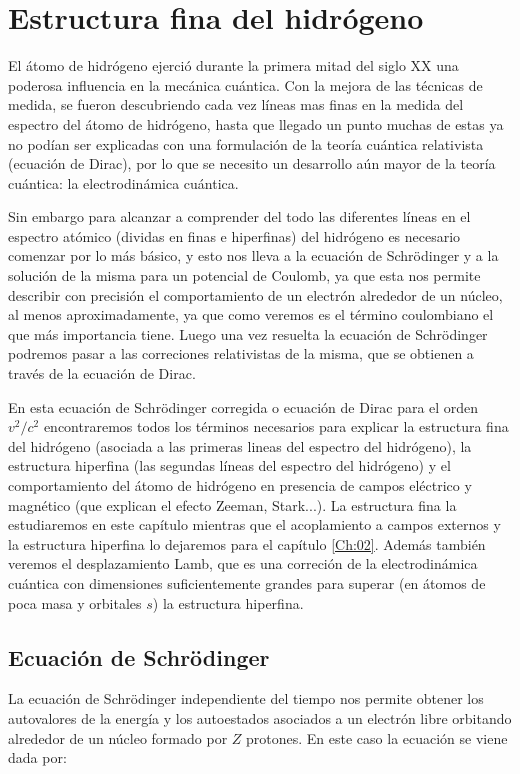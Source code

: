 \chapter{Estructura fina del hidrógeno}

El átomo de hidrógeno ejerció durante la primera mitad del siglo XX una poderosa influencia en la mecánica cuántica. Con la mejora de las técnicas de medida, se fueron descubriendo cada vez líneas mas finas en la medida del espectro del átomo de hidrógeno, hasta que llegado un punto muchas de estas ya no podían ser explicadas con una formulación de la teoría cuántica relativista (ecuación de Dirac), por lo que se necesito un desarrollo aún mayor de la teoría cuántica: la electrodinámica cuántica. 

Sin embargo para alcanzar a comprender del todo las diferentes líneas en el espectro atómico (dividas en finas e hiperfinas) del hidrógeno es necesario comenzar por lo más básico, y esto nos lleva a la ecuación de Schrödinger y a la solución de la misma para un potencial de Coulomb, ya que esta nos permite describir con precisión el comportamiento de un electrón alrededor de un núcleo, al menos aproximadamente, ya que como veremos es el término coulombiano el que más importancia tiene. Luego una vez resuelta la ecuación de Schrödinger podremos pasar a las correciones relativistas de la misma, que se obtienen a través de la ecuación de Dirac. 

En esta ecuación de Schrödinger corregida o ecuación de Dirac para el orden $v^2/c^2$ encontraremos todos los términos necesarios para explicar la estructura fina del hidrógeno (asociada a las primeras lineas del espectro del hidrógeno), la estructura hiperfina (las segundas líneas del espectro del hidrógeno) y el comportamiento del átomo de hidrógeno en presencia de campos eléctrico y magnético (que explican el efecto Zeeman, Stark...). La estructura fina la estudiaremos en este capítulo mientras que el acoplamiento a campos externos y la estructura hiperfina lo dejaremos para el capítulo \ref{Ch:02}. Además también veremos el desplazamiento Lamb, que es una correción de la electrodinámica cuántica con dimensiones suficientemente grandes para superar (en átomos de poca masa y orbitales $s$) la estructura hiperfina.

\section{Ecuación de Schrödinger}

La ecuación de Schrödinger independiente del tiempo nos permite obtener los autovalores de la energía y los autoestados asociados a un electrón libre orbitando alrededor de un núcleo formado por $Z$ protones. En este caso la ecuación se viene dada por:

